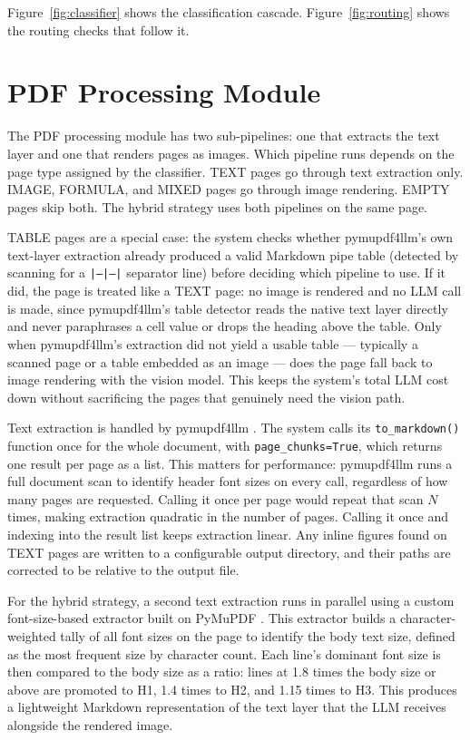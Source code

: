 Figure~\ref{fig:classifier} shows the classification cascade. Figure~\ref{fig:routing} shows the routing checks that follow it.

\section{PDF Processing Module}

The PDF processing module has two sub-pipelines: one that extracts the text layer and one that renders pages as images.
Which pipeline runs depends on the page type assigned by the classifier.
TEXT pages go through text extraction only. IMAGE, FORMULA, and MIXED pages go through image rendering. EMPTY pages skip both.
The hybrid strategy uses both pipelines on the same page.

TABLE pages are a special case: the system checks whether pymupdf4llm's own text-layer extraction already produced a valid Markdown pipe table (detected by scanning for a \texttt{|---|---|} separator line) before deciding which pipeline to use.
If it did, the page is treated like a TEXT page: no image is rendered and no LLM call is made, since pymupdf4llm's table detector reads the native text layer directly and never paraphrases a cell value or drops the heading above the table.
Only when pymupdf4llm's extraction did not yield a usable table --- typically a scanned page or a table embedded as an image --- does the page fall back to image rendering with the vision model.
This keeps the system's total LLM cost down without sacrificing the pages that genuinely need the vision path.

Text extraction is handled by pymupdf4llm \autocite{pymupdf4llm}.
The system calls its \texttt{to\_markdown()} function once for the whole
document, with \texttt{page\_chunks=True}, which returns one result per page
as a list.
This matters for performance: pymupdf4llm runs a full document scan to identify header font sizes on every call, regardless of how many pages are requested.
Calling it once per page would repeat that scan $N$ times, making extraction quadratic in the number of pages.
Calling it once and indexing into the result list keeps extraction linear.
Any inline figures found on TEXT pages are written to a configurable output directory, and their paths are corrected to be relative to the output file.

For the hybrid strategy, a second text extraction runs in parallel using a custom font-size-based extractor built on PyMuPDF \autocite{pymupdf}.
This extractor builds a character-weighted tally of all font sizes on the page to identify the body text size, defined as the most frequent size by character count.
Each line's dominant font size is then compared to the body size as a ratio: lines at 1.8 times the body size or above are promoted to H1, 1.4 times to H2, and 1.15 times to H3.
This produces a lightweight Markdown representation of the text layer that the LLM receives alongside the rendered image.


